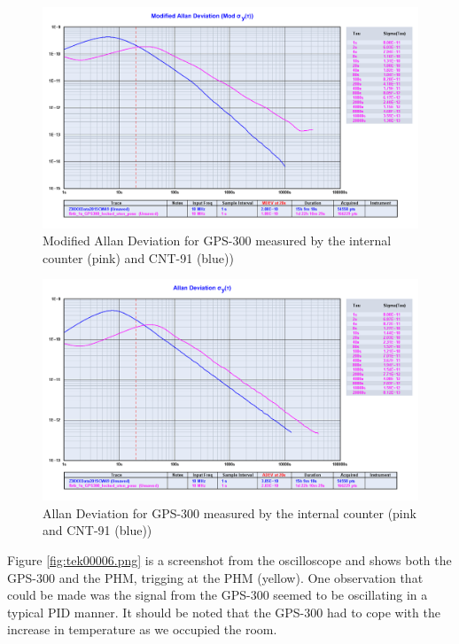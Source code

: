 \documentclass[11pt,english,a4paper]{article}
\begin{document}
\begin{figure}[!htb]
  \centering
    \includegraphics[width=1\textwidth]{part1_spm4_modified_allan.png}
      \caption{Modified Allan Deviation for GPS-300 measured by the internal counter (pink) and CNT-91 (blue))}
          \label{fig:part1_spm4_modified_allan}
\end{figure}

\begin{figure}[!htb]
  \centering
    \includegraphics[width=1\textwidth]{part1_spm4_allan.png}
      \caption{Allan Deviation for GPS-300 measured by the internal counter (pink and CNT-91 (blue))}
          \label{fig:part1_spm4_allan}
\end{figure}


Figure \ref{fig:tek00006.png} is a screenshot from the oscilloscope and shows both the GPS-300 and the PHM, trigging at the PHM (yellow). One observation that could be made was the signal from the GPS-300 seemed to be oscillating in a typical PID manner. It should be noted that the GPS-300 had to cope with the increase in temperature as we occupied the room.    
\end{document}
